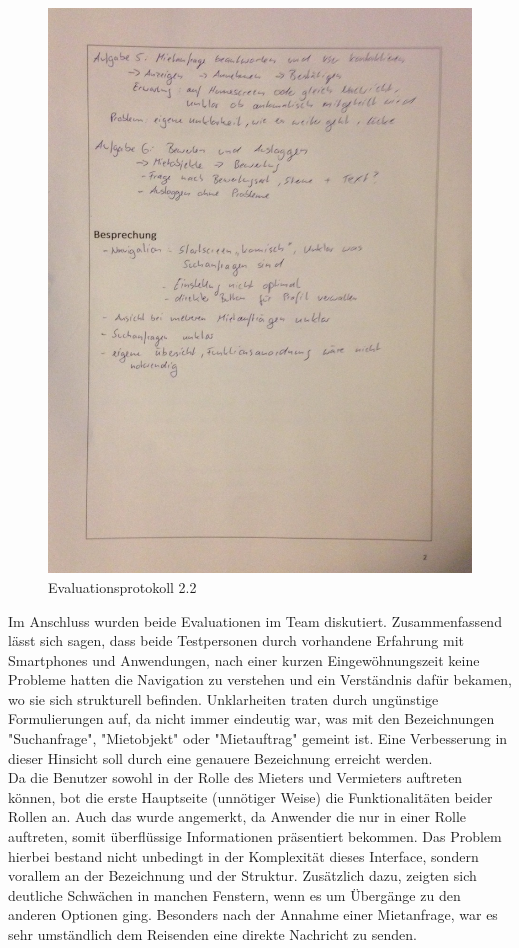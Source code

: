 \begin{figure}[H]
\includegraphics[width=1\textwidth]{./images/evaluation/eva22.JPG}
\caption{Evaluationsprotokoll 2.2}
\label{fig:evaluation22}
\end{figure}

\newpage
Im Anschluss wurden beide Evaluationen im Team diskutiert. Zusammenfassend lässt sich sagen, dass beide Testpersonen durch vorhandene Erfahrung mit Smartphones und Anwendungen, nach einer kurzen Eingewöhnungszeit keine Probleme hatten die Navigation zu verstehen und ein Verständnis dafür bekamen, wo sie sich strukturell befinden.
Unklarheiten traten durch ungünstige Formulierungen auf, da nicht immer eindeutig war, was mit den Bezeichnungen "Suchanfrage", "Mietobjekt" oder "Mietauftrag" gemeint ist. Eine Verbesserung in dieser Hinsicht soll durch eine genauere Bezeichnung erreicht werden.\\
Da die Benutzer sowohl in der Rolle des Mieters und Vermieters auftreten können, bot die erste Hauptseite (unnötiger Weise) die Funktionalitäten beider Rollen an. Auch das wurde angemerkt, da Anwender die nur in einer Rolle auftreten, somit überflüssige Informationen präsentiert bekommen. Das Problem hierbei bestand nicht unbedingt in der Komplexität dieses Interface, sondern vorallem an der Bezeichnung und der Struktur. Zusätzlich dazu, zeigten sich deutliche Schwächen in manchen Fenstern, wenn es um Übergänge zu den anderen Optionen ging. Besonders nach der Annahme einer Mietanfrage, war es sehr umständlich dem Reisenden eine direkte Nachricht zu senden. \\

